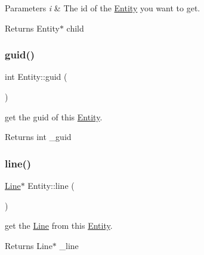 \begin{DoxyParams}{Parameters}
{\em i} & The id of the \hyperlink{class_entity}{Entity} you want to get. \\
\hline
\end{DoxyParams}
\begin{DoxyReturn}{Returns}
Entity$\ast$ child 
\end{DoxyReturn}
\mbox{\label{class_entity_ad4f911b665f003d191c2940d325da6d8}} 
\subsubsection{\texorpdfstring{guid()}{guid()}}
{\footnotesize\ttfamily int Entity\+::guid (\begin{DoxyParamCaption}{ }\end{DoxyParamCaption})\hspace{0.3cm}{\ttfamily [inline]}}



get the guid of this \hyperlink{class_entity}{Entity}. 

\begin{DoxyReturn}{Returns}
int \+\_\+guid 
\end{DoxyReturn}
\mbox{\label{class_entity_a81cacd62804c930558bc2ff3f0c927ae}} 
\subsubsection{\texorpdfstring{line()}{line()}}
{\footnotesize\ttfamily \hyperlink{class_line}{Line}$\ast$ Entity\+::line (\begin{DoxyParamCaption}{ }\end{DoxyParamCaption})\hspace{0.3cm}{\ttfamily [inline]}}



get the \hyperlink{class_line}{Line} from this \hyperlink{class_entity}{Entity}. 

\begin{DoxyReturn}{Returns}
Line$\ast$ \+\_\+line 
\end{DoxyReturn}
\mbox{\label{class_entity_a9e2f02efca39cd7c4eca36e662372c25}} 
